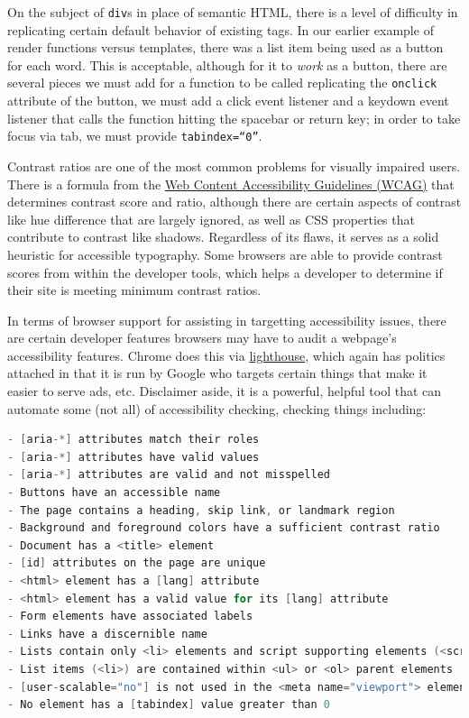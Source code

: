 \documentclass[11pt, twoside, reqno]{book}
\begin{document}
On the subject of \texttt{div}s in place of semantic HTML, there is a level of difficulty in replicating certain default behavior of existing tags. In our earlier example of render functions versus templates, there was a list item being used as a button for each word. This is acceptable, although for it to \textit{work} as a button, there are several pieces we must add for a function to be called replicating the \texttt{onclick} attribute of the button, we must add a click event listener and a keydown event listener that calls the function hitting the spacebar or return key; in order to take focus via tab, we must provide \texttt{tabindex=``0''}.

Contrast ratios are one of the most common problems for visually impaired users. There is a formula from the \href{https://www.w3.org/TR/2008/REC-WCAG20-20081211/#relativeluminancedef}{Web Content Accessibility Guidelines (WCAG)} that determines contrast score and ratio, although there are certain aspects of contrast like hue difference that are largely ignored, as well as CSS properties that contribute to contrast like shadows. Regardless of its flaws, it serves as a solid heuristic for accessible typography. Some browsers are able to provide contrast scores from within the developer tools, which helps a developer to determine if their site is meeting minimum contrast ratios.

In terms of browser support for assisting in targetting accessibility issues, there are certain developer features browsers may have to audit a webpage's accessibility features. Chrome does this via \href{https://developers.google.com/web/tools/lighthouse/}{lighthouse}, which again has politics attached in that it is run by Google who targets certain things that make it easier to serve ads, etc. Disclaimer aside, it is a powerful, helpful tool that can automate some (not all) of accessibility checking, checking things including:

\begin{lstlisting}[language=C]
- [aria-*] attributes match their roles
- [aria-*] attributes have valid values
- [aria-*] attributes are valid and not misspelled
- Buttons have an accessible name
- The page contains a heading, skip link, or landmark region
- Background and foreground colors have a sufficient contrast ratio
- Document has a <title> element
- [id] attributes on the page are unique
- <html> element has a [lang] attribute
- <html> element has a valid value for its [lang] attribute
- Form elements have associated labels
- Links have a discernible name
- Lists contain only <li> elements and script supporting elements (<script> and - <template>).
- List items (<li>) are contained within <ul> or <ol> parent elements
- [user-scalable="no"] is not used in the <meta name="viewport"> element and the - [maximum-scale] attribute is not less than 5.
- No element has a [tabindex] value greater than 0
\end{lstlisting}
\end{document}

